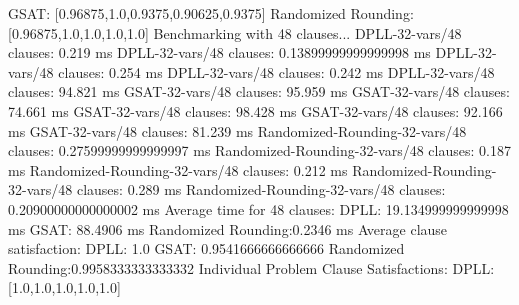 \documentclass{article}
\begin{document}
  GSAT:               [0.96875,1.0,0.9375,0.90625,0.9375]\newline
  Randomized Rounding:[0.96875,1.0,1.0,1.0,1.0]\newline
\newline
\newline
Benchmarking with 48 clauses...\newline
DPLL-32-vars/48 clauses: 0.219 ms\newline
DPLL-32-vars/48 clauses: 0.13899999999999998 ms\newline
DPLL-32-vars/48 clauses: 0.254 ms\newline
DPLL-32-vars/48 clauses: 0.242 ms\newline
DPLL-32-vars/48 clauses: 94.821 ms\newline
GSAT-32-vars/48 clauses: 95.959 ms\newline
GSAT-32-vars/48 clauses: 74.661 ms\newline
GSAT-32-vars/48 clauses: 98.428 ms\newline
GSAT-32-vars/48 clauses: 92.166 ms\newline
GSAT-32-vars/48 clauses: 81.239 ms\newline
Randomized-Rounding-32-vars/48 clauses: 0.27599999999999997 ms\newline
Randomized-Rounding-32-vars/48 clauses: 0.187 ms\newline
Randomized-Rounding-32-vars/48 clauses: 0.212 ms\newline
Randomized-Rounding-32-vars/48 clauses: 0.289 ms\newline
Randomized-Rounding-32-vars/48 clauses: 0.20900000000000002 ms\newline
Average time for 48 clauses:\newline
  DPLL:               19.134999999999998 ms\newline
  GSAT:               88.4906 ms\newline
  Randomized Rounding:0.2346 ms\newline
Average clause satisfaction:\newline
  DPLL:               1.0\newline
  GSAT:               0.9541666666666666\newline
  Randomized Rounding:0.9958333333333332\newline
\newline
Individual Problem Clause Satisfactions:\newline
  DPLL:               [1.0,1.0,1.0,1.0,1.0]\newline
\end{document}
